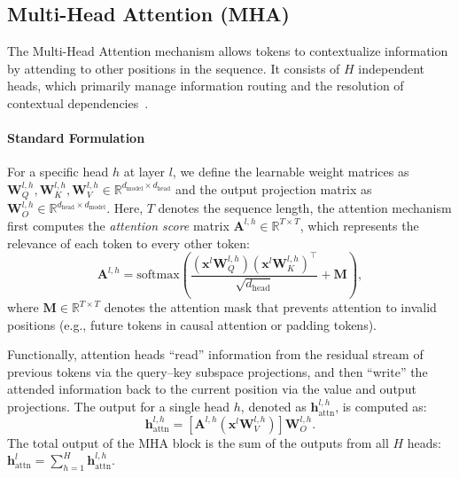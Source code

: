 \documentclass[11pt,letterpaper]{mystyle}
\begin{document}
\subsection{Multi-Head Attention (MHA)}
\label{sec:mha}
The Multi-Head Attention mechanism allows tokens to contextualize information by attending to other positions in the sequence. It consists of $H$ independent heads, which primarily manage information routing and the resolution of contextual dependencies~\citep{elhage2021mathematical,olsson2022incontextlearninginductionheads,voita2019analyzing,feng2023language,men2024unlocking}.


\paragraph{Standard Formulation}
For a specific head $h$ at layer $l$, we define the learnable weight matrices as 
$\mathbf{W}_Q^{l,h}, \mathbf{W}_K^{l,h}, \mathbf{W}_V^{l,h} \in \mathbb{R}^{d_{\text{model}} \times d_{\text{head}}}$ 
and the output projection matrix as 
$\mathbf{W}_O^{l,h} \in \mathbb{R}^{d_{\text{head}} \times d_{\text{model}}}$.
Here, $T$ denotes the sequence length, the attention mechanism first computes the \textit{attention score} matrix
$\mathbf{A}^{l,h} \in \mathbb{R}^{T \times T}$, 
which represents the relevance of each token to every other token:
\begin{equation}
\mathbf{A}^{l,h} = 
\text{softmax}\!\left(
    \frac{(\mathbf{x}^{l} \mathbf{W}_Q^{l,h}) (\mathbf{x}^{l} \mathbf{W}_K^{l,h})^\top}{\sqrt{d_{\text{head}}}}
    + \mathbf{M}
\right),
\end{equation}
where $\mathbf{M} \in \mathbb{R}^{T \times T}$ denotes the attention mask that prevents attention to invalid positions 
(e.g., future tokens in causal attention or padding tokens).

Functionally, attention heads ``read'' information from the residual stream of previous tokens via the 
query--key subspace projections, and then ``write'' the attended information back to the current position 
via the value and output projections. 
The output for a single head $h$, denoted as $\mathbf{h}_{\text{attn}}^{l,h}$, is computed as:
\begin{equation}
\mathbf{h}_{\text{attn}}^{l,h} = 
\left[\mathbf{A}^{l,h} (\mathbf{x}^{l} \mathbf{W}_V^{l,h})\right] \mathbf{W}_O^{l,h}.
\end{equation}
The total output of the MHA block is the sum of the outputs from all $H$ heads: $\mathbf{h}_{\text{attn}}^{l} = \sum^{H}_{h=1}\mathbf{h}_{\text{attn}}^{l,h}$.
\end{document}
